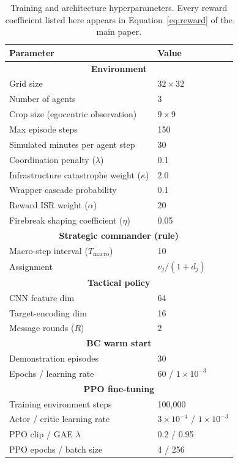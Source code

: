 \documentclass[letterpaper]{article}
\begin{document}
\begin{table}[H]
	\centering
	\caption{Training and architecture hyperparameters. Every reward coefficient listed here appears in Equation~\ref{eq:reward} of the main paper.}
	\label{tab:hyperparams}
	\small
	\setlength{\tabcolsep}{4pt}
	\begin{tabular}{ll}
		\toprule
		Parameter & Value \\
		\midrule
		\multicolumn{2}{c}{\textbf{Environment}} \\
		Grid size & $32 \times 32$ \\
		Number of agents & 3 \\
		Crop size (egocentric observation) & $9 \times 9$ \\
		Max episode steps & 150 \\
		Simulated minutes per agent step & 30 \\
		Coordination penalty ($\lambda$) & 0.1 \\
		Infrastructure catastrophe weight ($\kappa$) & 2.0 \\
		Wrapper cascade probability & 0.1 \\
		Reward ISR weight ($\alpha$) & 20 \\
		Firebreak shaping coefficient ($\eta$) & 0.05 \\
		\midrule
		\multicolumn{2}{c}{\textbf{Strategic commander (rule)}} \\
		Macro-step interval ($T_{\text{macro}}$) & 10 \\
		Assignment & $v_j/(1{+}d_j)$ \\
		\midrule
		\multicolumn{2}{c}{\textbf{Tactical policy}} \\
		CNN feature dim & 64 \\
		Target-encoding dim & 16 \\
		Message rounds ($R$) & 2 \\
		\midrule
		\multicolumn{2}{c}{\textbf{BC warm start}} \\
		Demonstration episodes & 30 \\
		Epochs / learning rate & 60 / $1 \times 10^{-3}$ \\
		\midrule
		\multicolumn{2}{c}{\textbf{PPO fine-tuning}} \\
		Training environment steps & 100,000 \\
		Actor / critic learning rate & $3\times10^{-4}$ / $1\times10^{-3}$ \\
		PPO clip / GAE $\lambda$ & 0.2 / 0.95 \\
		PPO epochs / batch size & 4 / 256 \\

\end{tabular}
\end{table}
\end{document}
